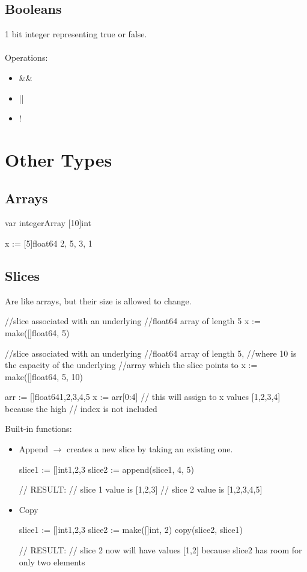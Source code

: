 \documentclass[twoside,a4paper,english]{report}
\begin{document}
\section{Booleans}
1 bit integer representing true or false.\\\\
Operations:
\begin{itemize}
\item \&\&
\item ||
\item !
\end{itemize}
\chapter{Other Types}
\section{Arrays}
\begin{go}
var integerArray [10]int

x := [5]float64{ 2, 5, 3, 1}
\end{go}
\section{Slices}
Are like arrays, but their size is allowed to change.\\
\begin{go}
//slice associated with an underlying
//float64 array of length 5
x := make([]float64, 5)

//slice associated with an underlying
//float64 array of length 5,
//where 10 is the capacity of the underlying
//array which the slice points to
x := make([]float64, 5, 10)

arr := []float64{1,2,3,4,5}
x := arr[0:4] // this will assign to x values [1,2,3,4] because the high 
              // index is not included
\end{go}
\vspace{0.7cm}
Built-in functions:\\
\begin{itemize}
\item Append $\rightarrow$ creates a new slice by taking an existing one.
\begin{go}
slice1 := []int{1,2,3}
slice2 := append(slice1, 4, 5)  

// RESULT:
// slice 1 value is [1,2,3]
// slice 2 value is [1,2,3,4,5]
\end{go} 
\item Copy
\begin{go}
slice1 := []int{1,2,3}
slice2 := make([]int, 2)
copy(slice2, slice1)

// RESULT:
// slice 2 now will have values [1,2] because slice2 has room for only two elements
\end{go}
\end{itemize}
\end{document}
